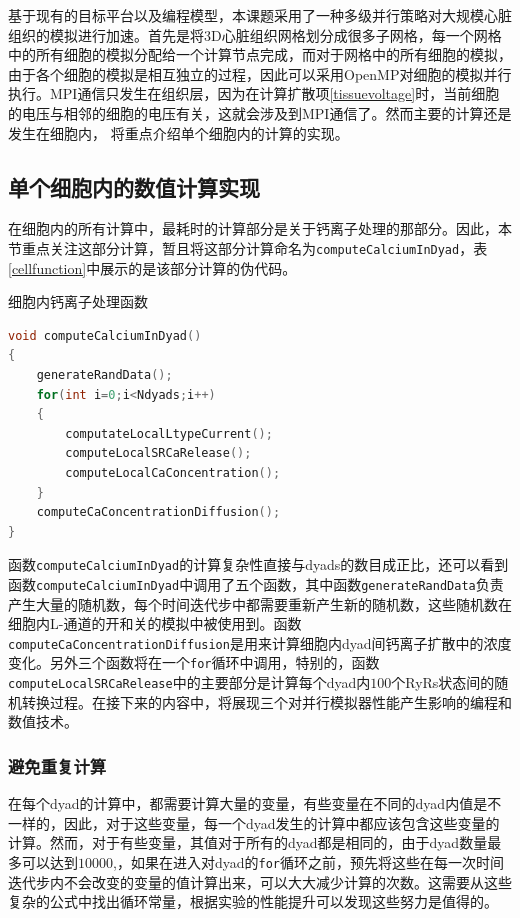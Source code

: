 基于现有的目标平台以及编程模型，本课题采用了一种多级并行策略对大规模心脏组织的模拟进行加速。首先是将3D心脏组织网格划分成很多子网格，每一个网格中的所有细胞的模拟分配给一个计算节点完成，而对于网格中的所有细胞的模拟，由于各个细胞的模拟是相互独立的过程，因此可以采用OpenMP对细胞的模拟并行执行。MPI通信只发生在组织层，因为在计算扩散项\ref{tissuevoltage}时，当前细胞的电压与相邻的细胞的电压有关，这就会涉及到MPI通信了。然而主要的计算还是发生在细胞内， \label{cellImp}将重点介绍单个细胞内的计算的实现。
 
 \subsection{单个细胞内的数值计算实现}
 \label{cellImp}
 在细胞内的所有计算中，最耗时的计算部分是关于钙离子处理的那部分。因此，本节重点关注这部分计算，暂且将这部分计算命名为{\tt computeCalciumInDyad}，表\ref{cellfunction}中展示的是该部分计算的伪代码。
 
 \begin{table}
\caption{细胞内钙离子处理函数}
\label{cellfunction}
\begin{lstlisting}[language=C++, basicstyle=\ttfamily\footnotesize]
void computeCalciumInDyad()
{
	generateRandData();
	for(int i=0;i<Ndyads;i++) 
	{
		computateLocalLtypeCurrent();
		computeLocalSRCaRelease();
		computeLocalCaConcentration();
	}
	computeCaConcentrationDiffusion();
}
\end{lstlisting}
\end{table}

 函数{\tt  computeCalciumInDyad}的计算复杂性直接与dyads的数目成正比，还可以看到函数{\tt  computeCalciumInDyad}中调用了五个函数，其中函数{\tt generateRandData}负责产生大量的随机数，每个时间迭代步中都需要重新产生新的随机数，这些随机数在细胞内L-通道的开和关的模拟中被使用到。函数{\tt  computeCaConcentrationDiffusion}是用来计算细胞内dyad间钙离子扩散中的浓度变化。另外三个函数将在一个{\tt for}循环中调用，特别的，函数{\tt computeLocalSRCaRelease}中的主要部分是计算每个dyad内$100$个RyRs状态间的随机转换过程。在接下来的内容中，将展现三个对并行模拟器性能产生影响的编程和数值技术。
 
 \subsubsection{避免重复计算}
在每个dyad的计算中，都需要计算大量的变量，有些变量在不同的dyad内值是不一样的，因此，对于这些变量，每一个dyad发生的计算中都应该包含这些变量的计算。然而，对于有些变量，其值对于所有的dyad都是相同的，由于dyad数量最多可以达到$10000$,，如果在进入对dyad的{\tt for}循环之前，预先将这些在每一次时间迭代步内不会改变的变量的值计算出来，可以大大减少计算的次数。这需要从这些复杂的公式中找出循环常量，根据实验的性能提升可以发现这些努力是值得的。

